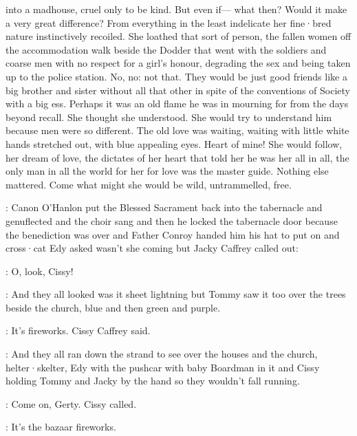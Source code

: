 into a madhouse,
cruel only to be kind.
But even if—%
what then?
Would it make a very great difference?
From everything in the least indelicate her
fine·bred nature instinctively recoiled.
She loathed that sort of person,
the fallen women off the accommodation walk beside the Dodder that went
with the soldiers and coarse men with no respect for a girl's honour,
degrading the sex and being taken up to the police station.
No,
no:
not
that.
They would be just good friends like a big brother and sister
without all that other in spite of the conventions of Society with a big
ess.
Perhaps it was an old flame he was in mourning for from the days
beyond recall.
She thought she understood.
She would try to understand
him because men were so different.
The old love was waiting,
waiting
with little white hands stretched out,
with blue appealing eyes.
Heart of mine!
She would follow,
her dream of love,
the dictates of her heart
that told her he was her all in all,
the only man in all the world
for her for love was the master guide.
Nothing else mattered.
Come what
might she would be wild,
untrammelled,
free.

:
Canon O'Hanlon put the Blessed Sacrament back into the tabernacle
and genuflected and the choir sang  and
then he locked the tabernacle door because the benediction was over and
Father Conroy handed him his hat to put on and cross·cat Edy asked wasn't
she coming but Jacky Caffrey called out:

\jacky:
O,
look,
Cissy!

:
And they all looked
was it sheet lightning
but Tommy saw it too
over the trees beside the church,
blue and then green and purple.

\cissy:
It's fireworks.
Cissy Caffrey said.

:
And they all ran down the strand to see over the houses and the
church,
helter·skelter,
Edy with the pushcar with baby Boardman in it and
Cissy holding Tommy and Jacky by the hand so they wouldn't fall running.

\cissy:
Come on,
Gerty.
Cissy called.

\cissy:
It's the bazaar fireworks.

